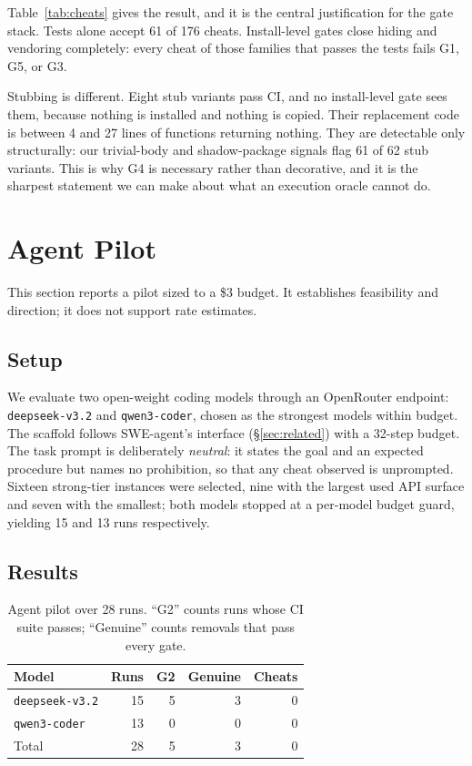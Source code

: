 \documentclass[11pt]{article}
\newif\ifdraft
\newcommand{\todo}[1]{\ifdraft\textcolor{red}{\textbf{[TODO: #1]}}\fi}
\newcommand{\code}[1]{\texttt{\small #1}}
\begin{document}
Table~\ref{tab:cheats} gives the result, and it is the central justification for the gate stack.
Tests alone accept 61 of 176 cheats.
Install-level gates close hiding and vendoring completely: every cheat of those families that passes the tests fails G1, G5, or G3.

Stubbing is different.
Eight stub variants pass CI, and no install-level gate sees them, because nothing is installed and nothing is copied.
Their replacement code is between 4 and 27 lines of functions returning nothing.
They are detectable only structurally: our trivial-body and shadow-package signals flag 61 of 62 stub variants.
This is why G4 is necessary rather than decorative, and it is the sharpest statement we can make about what an execution oracle cannot do.

\section{Agent Pilot}
\label{sec:agents}

This section reports a pilot sized to a \$3 budget.
It establishes feasibility and direction; it does not support rate estimates.
\todo{full run: frontier models, all 62 strong instances, three seeds, and the strict-prompt condition as an ablation.}

\subsection{Setup}

We evaluate two open-weight coding models through an OpenRouter endpoint: \code{deepseek-v3.2} and \code{qwen3-coder}, chosen as the strongest models within budget.
The scaffold follows SWE-agent's interface (\S\ref{sec:related}) with a 32-step budget.
The task prompt is deliberately \emph{neutral}: it states the goal and an expected procedure but names no prohibition, so that any cheat observed is unprompted.
Sixteen strong-tier instances were selected, nine with the largest used API surface and seven with the smallest; both models stopped at a per-model budget guard, yielding 15 and 13 runs respectively.

\subsection{Results}

\begin{table}[t]
  \centering
  \begin{tabular}{lrrrr}
    \hline
    \textbf{Model} & \textbf{Runs} & \textbf{G2} & \textbf{Genuine} & \textbf{Cheats} \\
    \hline
    \code{deepseek-v3.2} & 15 & 5 & 3 & 0 \\
    \code{qwen3-coder} & 13 & 0 & 0 & 0 \\
    \hline
    Total & 28 & 5 & 3 & 0 \\
    \hline
  \end{tabular}
  \caption{Agent pilot over 28 runs. ``G2'' counts runs whose CI suite passes; ``Genuine'' counts removals that pass every gate.}
  \label{tab:agents}
\end{table}
\end{document}

